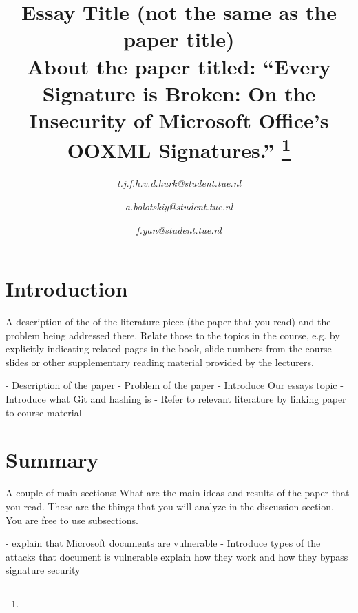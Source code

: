 \documentclass[conference]{IEEEtran}
\begin{document}
%
%
\title{Essay Title (not the same as the paper title)\\
{\footnotesize \textsuperscript{}About the paper titled: “Every Signature is Broken: On the Insecurity of Microsoft Office’s OOXML Signatures.”
}
\thanks{}
}
%
%
\author{
    \textit{t.j.f.h.v.d.hurk@student.tue.nl}
    \and
    \textit{a.bolotskiy@student.tue.nl}
    \and
    \textit{f.yan@student.tue.nl}
}
\maketitle
%
%
%
\section{Introduction}
A description of the of the literature piece (the paper that you read) and the problem being addressed there. Relate those to the topics in the course, e.g. by explicitly indicating related pages in the book, slide numbers from the course slides or other supplementary reading material provided by the lecturers.

- Description of the paper
- Problem of the paper
- Introduce Our essays topic
- Introduce what Git and hashing is
- Refer to relevant literature by linking paper to course material
%
%
\section{Summary}
A couple of main sections: What are the main ideas and results of the paper that you read. These are the things that you will analyze in the discussion section. You are free to use subsections.

- explain that Microsoft documents are vulnerable
- Introduce types of the attacks that document is vulnerable explain how they work and how they bypass signature security
\end{document}
